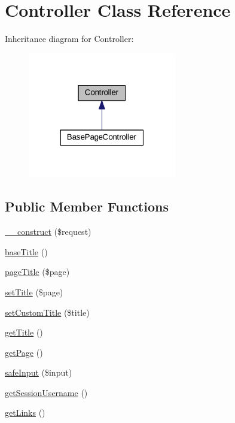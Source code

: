 \hypertarget{classController}{\section{Controller Class Reference}
\label{classController}
}


Inheritance diagram for Controller\+:\nopagebreak
\begin{figure}[H]
\begin{center}
\leavevmode
\includegraphics[width=184pt]{classController__inherit__graph}
\end{center}
\end{figure}
\subsection*{Public Member Functions}
\begin{DoxyCompactItemize}
\item 
\hyperlink{classController_ab91faf91a99b21a429324499f9ec9f70}{\+\_\+\+\_\+construct} (\$request)
\item 
\hyperlink{classController_a3057228d46eddceb352a1537ef05e8b7}{base\+Title} ()
\item 
\hyperlink{classController_a555247a38f8b4ea98a85bed7c6798e0a}{page\+Title} (\$page)
\item 
\hyperlink{classController_a99e010083a94a876c218d6fe16f70ed5}{set\+Title} (\$page)
\item 
\hyperlink{classController_af3f91509e2fbae1fd863df1577fcc4e7}{set\+Custom\+Title} (\$title)
\item 
\hyperlink{classController_ae8b4904843b2d665164620160b3c7157}{get\+Title} ()
\item 
\hyperlink{classController_aa844281accdd5aa2ca1ab1d890332b76}{get\+Page} ()
\item 
\hyperlink{classController_a90590c2cd8c1a89cc6eada64f0f24361}{safe\+Input} (\$input)
\item 
\hyperlink{classController_ac85206dce558e214f72fc3ca56f8cc31}{get\+Session\+Username} ()
\item 
\hyperlink{classController_a50e4138bea238a7bba318fffb948eeb1}{get\+Links} ()
\end{DoxyCompactItemize}
